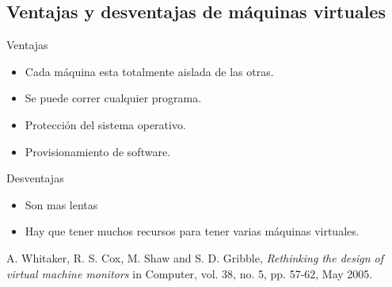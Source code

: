 \documentclass[12pt, times]{simauth}
\begin{document}
\subsection{Ventajas y desventajas de máquinas virtuales}
Ventajas
\begin{itemize}
 \item Cada máquina esta totalmente aislada de las otras.
 \item Se puede correr cualquier programa.
 \item Protección del sistema operativo.
 \item Provisionamiento de software.
\end{itemize}


Desventajas
\begin{itemize}
    \item Son mas lentas
    \item Hay que tener muchos recursos para tener varias máquinas virtuales.
\end{itemize}


\begin{thebibliography}{9}
    
     A. Whitaker, R. S. Cox, M. Shaw and S. D. Gribble, \textit{Rethinking the design of virtual machine monitors} in Computer, vol. 38, no. 5, pp. 57-62, May 2005.
    
\end{thebibliography}    
       
\end{document}
